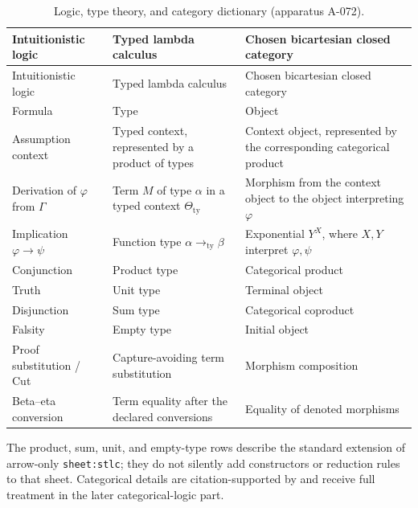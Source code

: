 \begingroup\small
\begin{longtable}{@{}p{}p{}p{}@{}}
\caption{Logic, type theory, and category dictionary (apparatus A-072).}
\label{tab:p07-curry-howard}\\
\toprule
Intuitionistic logic & Typed lambda calculus & Chosen bicartesian closed
category \\
\midrule
\endfirsthead
\toprule
Intuitionistic logic & Typed lambda calculus & Chosen bicartesian closed
category \\
\midrule
\endhead
Formula & Type & Object \\
Assumption context & Typed context, represented by a product of types &
Context object, represented by the corresponding categorical product \\
Derivation of \(\varphi\) from \(\Gamma\) & Term \(M\) of type \(\alpha\)
in a typed context \(\Theta_{\mathrm{ty}}\) & Morphism from the context object
to the object interpreting \(\varphi\) \\
Implication \(\varphi\to\psi\) & Function type
\(\alpha\mathbin{\to_{\mathrm{ty}}}\beta\) & Exponential \(Y^X\), where
\(X,Y\) interpret \(\varphi,\psi\) \\
Conjunction & Product type & Categorical product \\
Truth & Unit type & Terminal object \\
Disjunction & Sum type & Categorical coproduct \\
Falsity & Empty type & Initial object \\
Proof substitution / Cut & Capture-avoiding term substitution & Morphism
composition \\
Beta--eta conversion & Term equality after the declared conversions &
Equality of denoted morphisms \\
\bottomrule
\end{longtable}
\endgroup

The product, sum, unit, and empty-type rows describe the standard extension
of arrow-only \texttt{sheet:stlc}; they do not silently add constructors or
reduction rules to that sheet.  Categorical details are citation-supported by
\cite{GirardLafontTaylor1989,LambekScott1986} and receive full treatment in
the later categorical-logic part.


